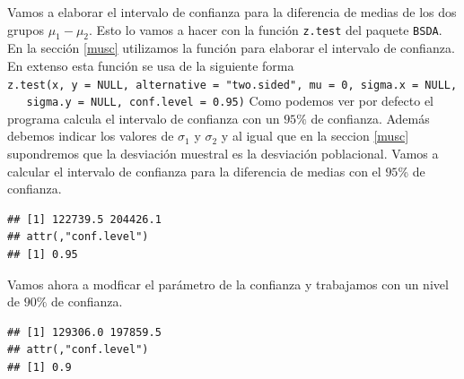 \documentclass[]{book}
\newenvironment{Shaded}{\begin{snugshade}}{\end{snugshade}}
\newcommand{\DataTypeTok}[1]{\textcolor[rgb]{0.13,0.29,0.53}{#1}}
\newcommand{\FloatTok}[1]{\textcolor[rgb]{0.00,0.00,0.81}{#1}}
\newcommand{\KeywordTok}[1]{\textcolor[rgb]{0.13,0.29,0.53}{\textbf{#1}}}
\newcommand{\NormalTok}[1]{#1}
\newcommand{\OperatorTok}[1]{\textcolor[rgb]{0.81,0.36,0.00}{\textbf{#1}}}
\begin{document}
Vamos a elaborar el intervalo de confianza para la diferencia de medias de los dos grupos \(\mu_1-\mu_2\). Esto lo vamos a hacer con la función \texttt{z.test} del paquete \texttt{BSDA}. En la sección \ref{musc} utilizamos la función para elaborar el intervalo de confianza. En extenso esta función se usa de la siguiente forma \texttt{z.test(x,\ y\ =\ NULL,\ alternative\ =\ "two.sided",\ mu\ =\ 0,\ sigma.x\ =\ NULL,\ \ \ sigma.y\ =\ NULL,\ conf.level\ =\ 0.95)} Como podemos ver por defecto el programa calcula el intervalo de confianza con un \(95\%\) de confianza. Además debemos indicar los valores de \(\sigma_1\) y \(\sigma_2\) y al igual que en la seccion \ref{musc} supondremos que la desviación muestral es la desviación poblacional. Vamos a calcular el intervalo de confianza para la diferencia de medias con el \(95\)\% de confianza.

\begin{Shaded}
\end{Shaded}

\begin{verbatim}
## [1] 122739.5 204426.1
## attr(,"conf.level")
## [1] 0.95
\end{verbatim}

Vamos ahora a modficar el parámetro de la confianza y trabajamos con un nivel de \(90\%\) de confianza.

\begin{Shaded}
\end{Shaded}

\begin{verbatim}
## [1] 129306.0 197859.5
## attr(,"conf.level")
## [1] 0.9
\end{verbatim}
\end{document}
